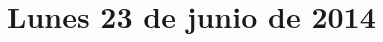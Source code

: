 \documentclass[12pt,spanish]{article}
\begin{document}
  \thispagestyle{empty}
  \pagestyle{empty}
  \section*{Lunes 23 de junio de 2014}

  
\end{document}
